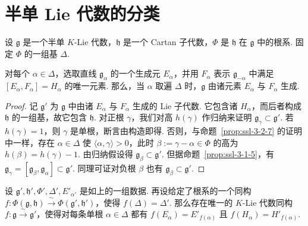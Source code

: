 \section{半单 Lie 代数的分类}\label{sec:ssl-3-3}
设 $\mathfrak g$ 是一个半单 $K$-Lie 代数，$\mathfrak h$ 是一个 Cartan 子代数，$\Phi$ 是 $\mathfrak h$ 在 $\mathfrak g$ 中的根系. 固定 $\Phi$ 的一组基 $\Delta$.
\begin{proposition}\label{prop:ssl-3-3-1}
对每个 $\alpha\in\Delta$，选取直线 $\mathfrak g_{\alpha}$ 的一个生成元 $E_{\alpha}$，并用 $F_{\alpha}$ 表示 $\mathfrak g_{-\alpha}$ 中满足 $[E_{\alpha},F_{\alpha}]=H_{\alpha}$ 的唯一元素. 那么，当 $\alpha$ 取遍 $\Delta$ 时，$\mathfrak g$ 由诸元素 $E_{\alpha}$ 与 $F_{\alpha}$ 生成.
\end{proposition}
\begin{proof}
记 $\mathfrak g'$ 为 $\mathfrak g$ 中由诸 $E_{\alpha}$ 与 $F_{\alpha}$ 生成的 Lie 子代数. 它包含诸 $H_{\alpha}$，而后者构成 $\mathfrak h$ 的一组基，故它包含 $\mathfrak h$. 对正根 $\gamma$，我们对高 $h(\gamma)$ 作归纳来证明 $\mathfrak g_{\gamma}\subset\mathfrak g'$. 若 $h(\gamma)=1$，则 $\gamma$ 是单根，断言由构造即得. 否则，与命题~\ref{prop:ssl-3-2-7} 的证明中一样，存在 $\alpha\in\Delta$ 使 $\langle\alpha,\gamma\rangle>0$，此时 $\beta:=\gamma-\alpha\in\Phi$ 的高为 $h(\beta)=h(\gamma)-1$. 由归纳假设得 $\mathfrak g_{\beta}\subset\mathfrak g'$. 但据命题~\ref{prop:ssl-3-1-5}，有 $\mathfrak g_{\gamma}=[\mathfrak g_{\beta},\mathfrak g_{\alpha}]\subset\mathfrak g'$. 同理可证对负根 $\beta$ 也有 $\mathfrak g_{\beta}\subset\mathfrak g'$.
\end{proof}
\begin{corollary}\label{cor:ssl-3-3-2}
设 $\mathfrak g',\mathfrak h',\Phi',\Delta',E'_{\alpha'}$ 是如上的一组数据. 再设给定了根系的一个同构 $f:\Phi(\mathfrak g,\mathfrak h)\xrightarrow{\ \sim\ }\Phi(\mathfrak g',\mathfrak h')$，使得 $f(\Delta)=\Delta'$. 那么存在唯一的 $K$-Lie 代数同构 $f:\mathfrak g\xrightarrow{\ \sim\ }\mathfrak g'$，使得对每条单根 $\alpha\in\Delta$ 都有 $f(E_{\alpha})=E'_{f(\alpha)}$ 且 $f(H_{\alpha})=H'_{f(\alpha)}$.
\end{corollary}
